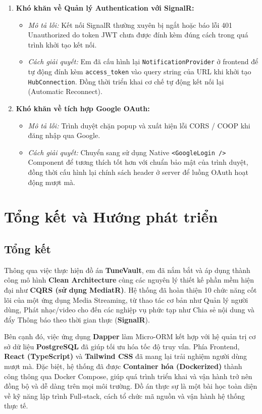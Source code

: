 \documentclass[a4paper,12pt]{article}
\begin{document}
\begin{enumerate}
    \item \textbf{Khó khăn về Quản lý Authentication với SignalR:}
    \begin{itemize}
        \item \textit{Mô tả lỗi:} Kết nối SignalR thường xuyên bị ngắt hoặc báo lỗi 401 Unauthorized do token JWT chưa được đính kèm đúng cách trong quá trình khởi tạo kết nối.
        \item \textit{Cách giải quyết:} Em đã cấu hình lại \texttt{NotificationProvider} ở frontend để tự động đính kèm \texttt{access\_token} vào query string của URL khi khởi tạo \texttt{HubConnection}. Đồng thời triển khai cơ chế tự động kết nối lại (Automatic Reconnect).
    \end{itemize}
    
    \item \textbf{Khó khăn về tích hợp Google OAuth:}
    \begin{itemize}
        \item \textit{Mô tả lỗi:} Trình duyệt chặn popup và xuất hiện lỗi CORS / COOP khi đăng nhập qua Google.
        \item \textit{Cách giải quyết:} Chuyển sang sử dụng Native \texttt{<GoogleLogin />} Component để tương thích tốt hơn với chuẩn bảo mật của trình duyệt, đồng thời cấu hình lại chính sách header ở server để luồng OAuth hoạt động mượt mà.
    \end{itemize}
\end{enumerate}

\section{Tổng kết và Hướng phát triển}
\subsection{Tổng kết}
Thông qua việc thực hiện đồ án \textbf{TuneVault}, em đã nắm bắt và áp dụng thành công mô hình \textbf{Clean Architecture} cùng các nguyên lý thiết kế phần mềm hiện đại như \textbf{CQRS (sử dụng MediatR)}. Hệ thống đã hoàn thiện 10 chức năng cốt lõi của một ứng dụng Media Streaming, từ thao tác cơ bản như Quản lý người dùng, Phát nhạc/video cho đến các nghiệp vụ phức tạp như Chia sẻ nội dung và đẩy Thông báo theo thời gian thực (\textbf{SignalR}).

Bên cạnh đó, việc ứng dụng \textbf{Dapper} làm Micro-ORM kết hợp với hệ quản trị cơ sở dữ liệu \textbf{PostgreSQL} đã giúp tối ưu hóa tốc độ truy vấn. Phía Frontend, \textbf{React (TypeScript)} và \textbf{Tailwind CSS} đã mang lại trải nghiệm người dùng mượt mà. Đặc biệt, hệ thống đã được \textbf{Container hóa (Dockerized)} thành công thông qua Docker Compose, giúp quá trình triển khai và vận hành trở nên đồng bộ và dễ dàng trên mọi môi trường. Đồ án thực sự là một bài học toàn diện về kỹ năng lập trình Full-stack, cách tổ chức mã nguồn và vận hành hệ thống thực tế.
\end{document}
